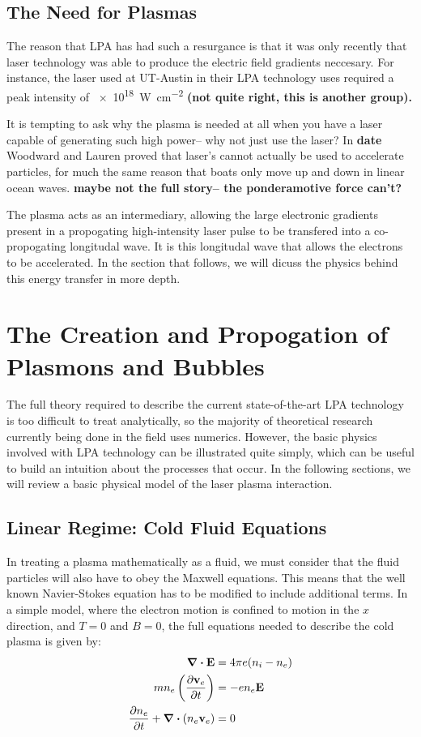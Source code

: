 \documentclass[12pt, titlepage]{article}
\begin{document}
\subsection{The Need for Plasmas}
The reason that LPA has had such a resurgance is that it was only recently that laser technology was able to produce the electric field gradients neccesary. For instance, the laser used at UT-Austin in their LPA technology uses required a peak intensity of \SI{e18}{W.cm^{-2}} {\bf (not quite right, this is another group).}

It is tempting to ask why the plasma is needed at all when you have a laser capable of generating such high power-- why not just use the laser? In {\bf date} Woodward and Lauren proved that laser's cannot actually be used to accelerate particles, for much the same reason that boats only move up and down in linear ocean waves. {\bf maybe not the full story-- the ponderamotive force can't?}

The plasma acts as an intermediary, allowing the large electronic gradients present in a propogating high-intensity laser pulse to be transfered into a co-propogating longitudal wave. It is this longitudal wave that allows the electrons to be accelerated. In the section that follows, we will dicuss the physics behind this energy transfer in more depth.
\section{The Creation and Propogation of Plasmons and Bubbles}
The full theory required to describe the current state-of-the-art LPA technology is
too difficult to treat analytically, so the majority of theoretical research currently
being done in the field uses numerics. However, the basic physics involved with LPA technology
can be illustrated quite simply, which can be useful to build an intuition about the
processes that occur. In the following sections, we will review a basic physical model
of the laser plasma interaction.
\subsection{Linear Regime: Cold Fluid Equations}
In treating a plasma mathematically as a fluid, we must consider that the fluid particles
will also have to obey the Maxwell equations. This means that the well known Navier-Stokes
equation has to be modified to include additional terms. In a simple model, where the electron
motion is confined to motion in the $x$ direction, and $T=0$ and $B=0$, the full equations
needed to describe the cold plasma is given by:
\begin{subequations}
    \begin{align}
        \div{\vb{E}} & = 4 \pi e \qty(n_i-n_e) \\
    m n_e \left( \pdv{\vb{v}_e}{t} \right) &= -e n_e \vb{E} \\
        \pdv{n_e}{t} + \div{ \qty(n_e \vb{v}_e)} & = 0\\
    \end{align}
\end{subequations}
\end{document}

